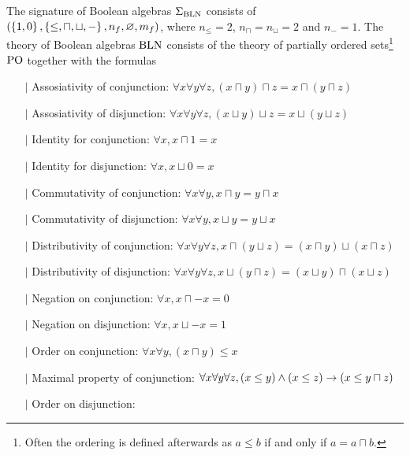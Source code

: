 \begin{dfn}
    The signature of Boolean algebras $\Sigma_{\mathrm{BLN}}$ consists of 
    $(\left\{1,0\right\},\left\{\leq,\sqcap,\sqcup,-\right\},n_f,\varnothing,m_f)$,
    where $n_\leq = 2$, $n_\sqcap = n_\sqcup = 2$ and $n_- = 1$.
    The theory of Boolean algebras $\mathrm{BLN}$ consists of the theory of 
    partially ordered sets\footnote{Often 
        the ordering is defined afterwards as 
        $a \leq b$ if and only if $a = a \sqcap b$.} 
    $\mathrm{PO}$ together with the formulas
    \begin{itemize}
        \item[$\vert$] Assosiativity of conjunction: 
            $\forall x \forall y \forall z, 
            (x \sqcap y) \sqcap z = x \sqcap (y \sqcap z)$
        \item[$\vert$] Assosiativity of disjunction: 
            $\forall x \forall y \forall z, 
            (x \sqcup y) \sqcup z = x \sqcup (y \sqcup z)$
        \item[$\vert$] Identity for conjunction:
            $\forall x, x \sqcap 1 = x$ 
        \item[$\vert$] Identity for disjunction:
            $\forall x, x \sqcup 0 = x$ 
        \item[$\vert$] Commutativity of conjunction: 
            $\forall x \forall y, x \sqcap y = y \sqcap x$
        \item[$\vert$] Commutativity of disjunction: 
            $\forall x \forall y, x \sqcup y = y \sqcup x$
        \item[$\vert$] Distributivity of conjunction:
            $\forall x \forall y \forall z, 
            x \sqcap (y \sqcup z) = (x \sqcap y) \sqcup (x \sqcap z)$
        \item[$\vert$] Distributivity of disjunction:
            $\forall x \forall y \forall z, 
            x \sqcup (y \sqcap z) = (x \sqcup y) \sqcap (x \sqcup z)$
        \item[$\vert$] Negation on conjunction: 
            $\forall x, x \sqcap - x = 0$ 
        \item[$\vert$] Negation on disjunction: 
            $\forall x, x \sqcup - x = 1$ 
        \item[$\vert$] Order on conjunction:
            $\forall x \forall y, (x \sqcap y) \leq x$
        \item[$\vert$] Maximal property of conjunction:
            $\forall x \forall y \forall z, 
            (x \leq y) \land (x \leq z) \to (x \leq y \sqcap z)$ 
        \item[$\vert$] Order on disjunction:

\end{itemize}
\end{dfn}
